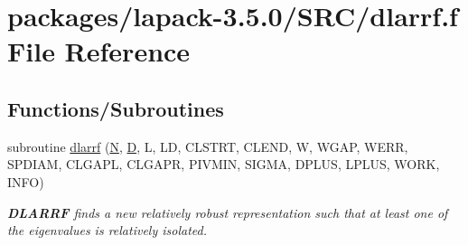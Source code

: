 \hypertarget{dlarrf_8f}{}\section{packages/lapack-\/3.5.0/\+S\+R\+C/dlarrf.f File Reference}
\label{dlarrf_8f}
\subsection*{Functions/\+Subroutines}
\begin{DoxyCompactItemize}
\item 
subroutine \hyperlink{group__auxOTHERauxiliary_ga6fa2f60646088821e40fbe04a41aa7b1}{dlarrf} (\hyperlink{polmisc_8c_a0240ac851181b84ac374872dc5434ee4}{N}, \hyperlink{odrpack_8h_a7dae6ea403d00f3687f24a874e67d139}{D}, L, L\+D, C\+L\+S\+T\+R\+T, C\+L\+E\+N\+D, W, W\+G\+A\+P, W\+E\+R\+R, S\+P\+D\+I\+A\+M, C\+L\+G\+A\+P\+L, C\+L\+G\+A\+P\+R, P\+I\+V\+M\+I\+N, S\+I\+G\+M\+A, D\+P\+L\+U\+S, L\+P\+L\+U\+S, W\+O\+R\+K, I\+N\+F\+O)
\begin{DoxyCompactList}\small\item\em {\bfseries D\+L\+A\+R\+R\+F} finds a new relatively robust representation such that at least one of the eigenvalues is relatively isolated. \end{DoxyCompactList}\end{DoxyCompactItemize}
